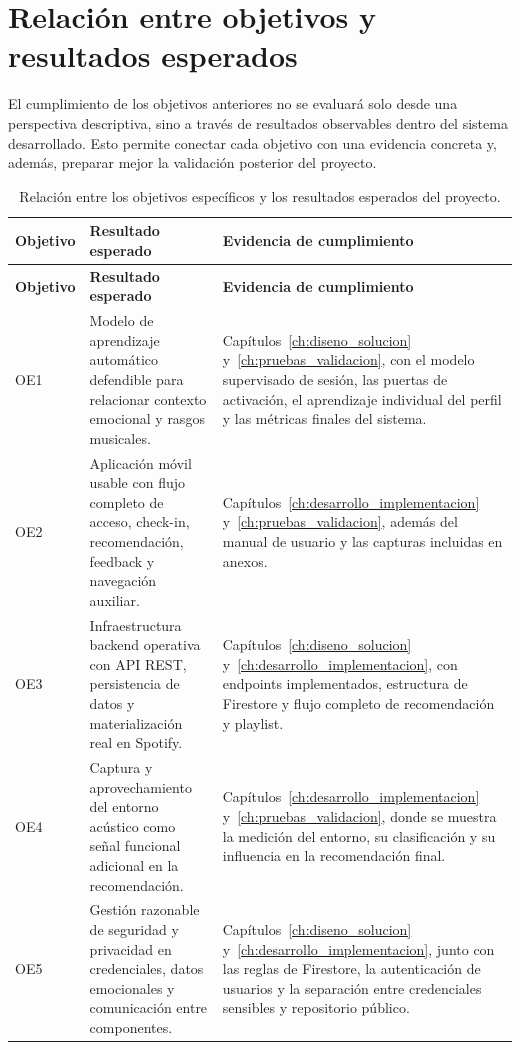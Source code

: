 \section{Relación entre objetivos y resultados esperados}
\label{sec:objetivos_resultados}

El cumplimiento de los objetivos anteriores no se evaluará solo desde una perspectiva descriptiva, sino a través de resultados observables dentro del sistema desarrollado. Esto permite conectar cada objetivo con una evidencia concreta y, además, preparar mejor la validación posterior del proyecto.

\small
\renewcommand{\arraystretch}{1.08}
\setlength{\LTpre}{0pt}
\setlength{\LTpost}{0pt}
\begin{longtable}{|p{1.7cm}|p{4.7cm}|p{7.15cm}|}
\caption{Relación entre los objetivos específicos y los resultados esperados del proyecto.}
\label{tab:objetivos_resultados}\\
\hline
\textbf{Objetivo} & \textbf{Resultado esperado} & \textbf{Evidencia de cumplimiento} \\
\hline
\endfirsthead
\hline
\textbf{Objetivo} & \textbf{Resultado esperado} & \textbf{Evidencia de cumplimiento} \\
\hline
\endhead
\hline
\endfoot
OE1 & Modelo de aprendizaje automático defendible para relacionar contexto emocional y rasgos musicales. & Capítulos~\ref{ch:diseno_solucion} y~\ref{ch:pruebas_validacion}, con el modelo supervisado de sesión, las puertas de activación, el aprendizaje individual del perfil y las métricas finales del sistema. \\
\hline
OE2 & Aplicación móvil usable con flujo completo de acceso, check-in, recomendación, feedback y navegación auxiliar. & Capítulos~\ref{ch:desarrollo_implementacion} y~\ref{ch:pruebas_validacion}, además del manual de usuario y las capturas incluidas en anexos. \\
\hline
OE3 & Infraestructura backend operativa con API REST, persistencia de datos y materialización real en Spotify. & Capítulos~\ref{ch:diseno_solucion} y~\ref{ch:desarrollo_implementacion}, con endpoints implementados, estructura de Firestore y flujo completo de recomendación y playlist. \\
\hline
OE4 & Captura y aprovechamiento del entorno acústico como señal funcional adicional en la recomendación. & Capítulos~\ref{ch:desarrollo_implementacion} y~\ref{ch:pruebas_validacion}, donde se muestra la medición del entorno, su clasificación y su influencia en la recomendación final. \\
\hline
OE5 & Gestión razonable de seguridad y privacidad en credenciales, datos emocionales y comunicación entre componentes. & Capítulos~\ref{ch:diseno_solucion} y~\ref{ch:desarrollo_implementacion}, junto con las reglas de Firestore, la autenticación de usuarios y la separación entre credenciales sensibles y repositorio público. \\
\hline
\end{longtable}

